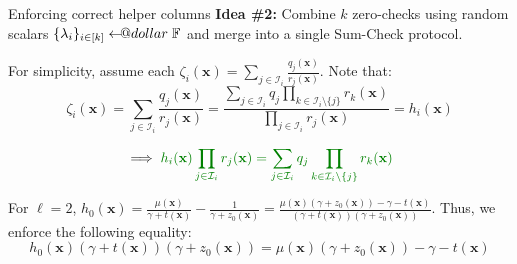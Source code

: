 \documentclass{zkdl-presentation-template}
\makeatletter
\newcommand\leftarrowS{\leftarrow\joinrel\smalldollar}
\newcommand{\smalldollar}{\mathrel{\mathpalette\small@dollar\relax}}
\newcommand{\small@dollar}[2]{%
  \vcenter{\hbox{%
    $#1\textnormal{\fontsize{0.7\dimexpr\f@size pt}{0}\selectfont\$}$%
  }}%
}
\makeatother
\begin{document}
    \begin{frame}{Enforcing correct helper columns}
        \textbf{Idea \#2:} Combine $k$ zero-checks using random scalars
        $\{\lambda_i\}_{i \in [k]} \leftarrowS \mathbb{F}$ and merge into a
        single Sum-Check protocol.

        For simplicity, assume each $\zeta_i(\mathbf{x}) = \sum_{j \in
        \mathcal{I}_i} \frac{q_j(\mathbf{x})}{r_j(\mathbf{x})}$. Note that:
        \begin{equation*}
            \zeta_i(\mathbf{x}) = \sum_{j \in
        \mathcal{I}_i} \frac{q_j(\mathbf{x})}{r_j(\mathbf{x})}  = 
        \frac{\sum_{j \in \mathcal{I}_i}q_j\prod_{k \in \mathcal{I}_i \setminus \{j\}}r_k(\mathbf{x})}{\prod_{j \in \mathcal{I}_i}r_j(\mathbf{x})}  = h_i(\mathbf{x})
        \end{equation*}
        
        \vspace{-20px}

        \begin{equation*}
            \implies \textcolor{green!50!black}{h_i(\mathbf{x})\prod_{j \in \mathcal{I}_i}r_j(\mathbf{x}) = \sum_{j \in \mathcal{I}_i}q_j\prod_{k \in \mathcal{I}_i \setminus \{j\}}r_k(\mathbf{x})}
        \end{equation*}

        \begin{example}
            For $\ell=2$, $h_0(\mathbf{x}) = \frac{\mu(\mathbf{x})}{\gamma+t(\mathbf{x})} - \frac{1}{\gamma+z_0(\mathbf{x})} = \frac{\mu(\mathbf{x})(\gamma+z_0(\mathbf{x})) - \gamma - t(\mathbf{x})}{(\gamma+t(\mathbf{x}))(\gamma+z_0(\mathbf{x}))}$. Thus, we enforce
            the following equality:
            \begin{equation*}
                h_0(\mathbf{x})(\gamma+t(\mathbf{x}))(\gamma+z_0(\mathbf{x})) = \mu(\mathbf{x})(\gamma+z_0(\mathbf{x})) - \gamma - t(\mathbf{x})
            \end{equation*}
        \end{example}
    \end{frame}
\end{document}
